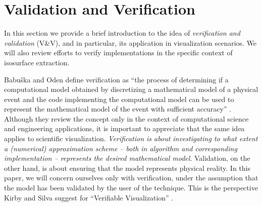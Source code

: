 \section{Validation and Verification}
\label{chap1:sec:vv}

In this section we provide a brief introduction to the idea of
\emph{verification and validation} (V\&V), and in particular, its
application in visualization scenarios. We will also review 
efforts to verify implementations in the specific context of
isosurface extraction.


Babu\v{s}ka and Oden define verification as ``the process of determining
if a computational model obtained by discretizing a mathematical model
of a physical event and the code implementing the computational model
can be used to represent the mathematical model of the event with
sufficient accuracy'' \cite{babuska04}.  Although they review the concept 
only in the context of computational science and engineering applications, 
it is important to appreciate that the same idea applies to
scientific visualization. \emph{Verification is about investigating to
what extent a (numerical) approximation scheme -- both in algorithm
and corresponding implementation -- represents the desired mathematical
model}. Validation, on the other hand, is about ensuring that the
model represents physical reality. In this paper, we will concern
ourselves only with verification, under the assumption that the 
model has been validated by the user of the technique. This is the
perspective Kirby and Silva suggest for ``Verifiable Visualization''
\cite{kirby-vv-08}.


